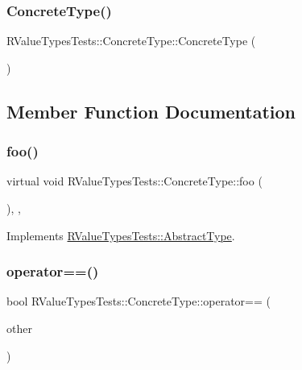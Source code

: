 \subsubsection{\texorpdfstring{ConcreteType()}{ConcreteType()}}
{\footnotesize\ttfamily R\+Value\+Types\+Tests\+::\+Concrete\+Type\+::\+Concrete\+Type (\begin{DoxyParamCaption}{ }\end{DoxyParamCaption})\hspace{0.3cm}{\ttfamily [inline]}}



\subsection{Member Function Documentation}
\mbox{\label{classRValueTypesTests_1_1ConcreteType_a81934e34d992dbda4331cf4e1de0859b}} 
\subsubsection{\texorpdfstring{foo()}{foo()}}
{\footnotesize\ttfamily virtual void R\+Value\+Types\+Tests\+::\+Concrete\+Type\+::foo (\begin{DoxyParamCaption}{ }\end{DoxyParamCaption})\hspace{0.3cm}{\ttfamily [inline]}, {\ttfamily [override]}, {\ttfamily [virtual]}}



Implements \mbox{\hyperlink{classRValueTypesTests_1_1AbstractType_add978e6db72f1d50cd897aae395b3d0d}{R\+Value\+Types\+Tests\+::\+Abstract\+Type}}.

\mbox{\label{classRValueTypesTests_1_1ConcreteType_a798601cc8c128dda8a648038bd29d1e8}} 
\subsubsection{\texorpdfstring{operator==()}{operator==()}}
{\footnotesize\ttfamily bool R\+Value\+Types\+Tests\+::\+Concrete\+Type\+::operator== (\begin{DoxyParamCaption}\item[{const \mbox{\hyperlink{classRValueTypesTests_1_1ConcreteType}{Concrete\+Type}} \&}]{other }\end{DoxyParamCaption})\hspace{0.3cm}{\ttfamily [inline]}}



